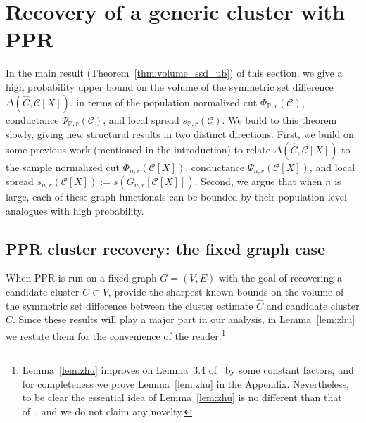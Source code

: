 \documentclass[11pt,twoside]{article}
\newcommand{\1}{\mathbf{1}}
\newcommand{\mc}[1]{\mathcal{#1}}
\newcommand{\Pbb}{\mathbb{P}}
\newcommand{\wh}[1]{\widehat{#1}}
\begin{document}
\section{Recovery of a generic cluster with PPR}
\label{sec:ub_symmetric_set_difference}

In the main result (Theorem~\ref{thm:volume_ssd_ub}) of this section, we give a high probability upper bound on the volume of the symmetric set difference $\Delta(\wh{C}, \mc{C}[X])$, in terms of the population normalized cut $\Phi_{\Pbb,r}(\mc{C})$, conductance $\Psi_{\Pbb,r}(\mc{C})$, and local spread $s_{\Pbb,r}(\mc{C})$. We build to this theorem slowly, giving new structural results in two distinct directions. First, we build on some previous work (mentioned in the introduction) to relate $\Delta(\wh{C}, \mc{C}[X])$ to the sample normalized cut $\Phi_{n,r}(\mc{C}[X])$, conductance $\Psi_{n,r}(\mc{C}[X])$, and local spread $s_{n,r}(\mc{C}[X]) := s(G_{n,r}[\mc{C}[X]])$. Second, we argue that when $n$ is large, each of these graph functionals can be bounded by their population-level analogues with high probability.

\subsection{PPR cluster recovery: the fixed graph case}
\label{subsec:ppr_cluster_recovery_fixed_graph}
When PPR is run on a fixed graph $G = (V,E)$ with the goal of recovering a candidate cluster $C \subset V$, \cite{zhu2013} provide the sharpest known bounds on the volume of the symmetric set difference between the cluster estimate $\wh{C}$ and candidate cluster $C$. Since these results will play a major part in our analysis, in Lemma~\ref{lem:zhu} we restate them for the convenience of the reader.\footnote{Lemma~\ref{lem:zhu} improves on Lemma~3.4 of~\cite{zhu2013} by some constant factors, and for completeness we prove Lemma~\ref{lem:zhu} in the Appendix. Nevertheless, to be clear the essential idea of Lemma~\ref{lem:zhu} is no different than that of~\cite{zhu2013}, and we do not claim any novelty.}
\end{document}
